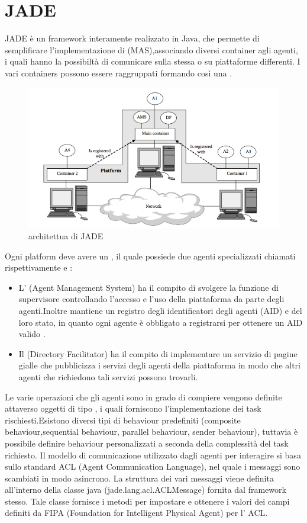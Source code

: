 \section{JADE}
JADE è un framework interamente realizzato in Java, che permette di  semplificare l'implementazione di  (MAS),associando diversi container agli agenti, i quali hanno la possibiltà di comunicare sulla stessa o su piattaforme differenti.
I vari containers possono essere raggruppati formando così una .
\begin{figure}[H]
\begin{center}
\includegraphics[scale=0.5]{etc/jade_architettura.png}
\caption{architettua di JADE}
\label{architettura_jade}
\end{center}
\end{figure} 
Ogni platform deve avere un , il quale possiede due agenti specializzati chiamati rispettivamente  e :
\begin{itemize}
\item L' (Agent Management System) ha il compito di svolgere la funzione di supervisore controllando l’accesso e l’uso della
piattaforma da parte degli agenti.Inoltre mantiene un registro degli identificatori degli agenti (AID) e del loro stato, in quanto ogni agente
 è obbligato a registrarsi per ottenere un AID valido . 
\item Il  (Directory Facilitator) ha il compito di implementare un servizio di pagine gialle che pubblicizza i servizi degli agenti della piattaforma in modo che altri agenti che richiedono tali servizi possono trovarli.
\end{itemize}
Le varie operazioni che gli agenti sono in grado di compiere vengono definite attaverso oggetti di tipo , i quali forniscono l'implementazione dei task rischiesti.Esistono diversi tipi di behaviour predefiniti (composite behaviour,sequential behaviour, parallel
behaviour, sender behaviour), tuttavia è possibile definire behaviour personalizzati a seconda della complessità del task richiesto.
Il modello di comunicazione utilizzato dagli agenti per interagire si basa sullo standard ACL (Agent Communication Language), nel quale i messaggi sono scambiati in modo asincrono. 
La struttura dei vari messaggi viene definita all'interno della classe java (jade.lang.acl.ACLMessage) fornita dal framework stesso.
Tale classe fornisce i metodi per impostare e ottenere i valori dei campi definiti da FIPA (Foundation for Intelligent Physical Agent) per l’ ACL.
